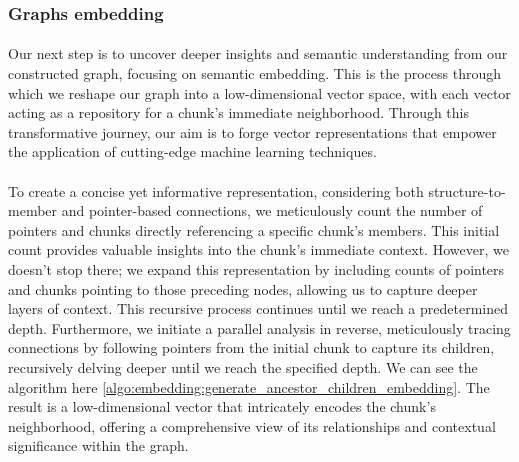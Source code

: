     \subsubsection{Graphs embedding}

        \paragraph{}Our next step is to uncover deeper insights and semantic understanding from our constructed graph, focusing on semantic embedding. This is the process through which we reshape our graph into a low-dimensional vector space, with each vector acting as a repository for a \gls{chunk}'s immediate neighborhood. Through this transformative journey, our aim is to forge vector representations that empower the application of cutting-edge machine learning techniques.

        \paragraph{}To create a concise yet informative representation, considering both structure-to-member and pointer-based connections, we meticulously count the number of \glspl{pointer} and \glspl{chunk} directly referencing a specific \gls{chunk}'s members. This initial count provides valuable insights into the \gls{chunk}'s immediate context. However, we doesn't stop there; we expand this representation by including counts of \glspl{pointer} and \glspl{chunk} pointing to those preceding nodes, allowing us to capture deeper layers of context. This recursive process continues until we reach a predetermined depth. Furthermore, we initiate a parallel analysis in reverse, meticulously tracing connections by following \glspl{pointer} from the initial \gls{chunk} to capture its children, recursively delving deeper until we reach the specified depth. We can see the algorithm here \ref{algo:embedding:generate_ancestor_children_embedding}. The result is a low-dimensional vector that intricately encodes the \gls{chunk}'s neighborhood, offering a comprehensive view of its relationships and contextual significance within the graph.

